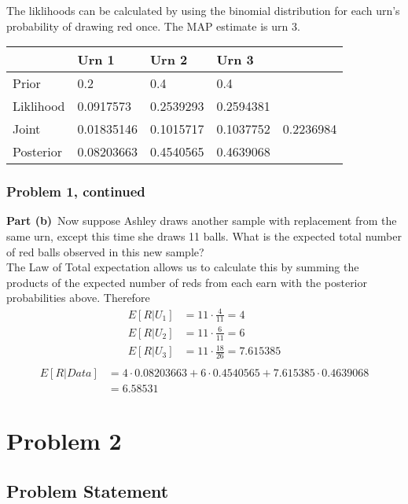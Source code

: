 \documentclass[12pt]{article}
\theoremstyle{definition}
\begin{document}
The liklihoods can be calculated by using the binomial distribution for each urn's probability of drawing red once. The MAP estimate is urn 3.\\

\begin{tabular}{lllll}
          & Urn 1      & Urn 2     & Urn 3     &           \\
\hline
Prior     & 0.2        & 0.4       & 0.4       &           \\
Liklihood & 0.0917573  & 0.2539293 & 0.2594381 &           \\
Joint     & 0.01835146 & 0.1015717 & 0.1037752 & 0.2236984 \\
Posterior & 0.08203663 & 0.4540565 & 0.4639068 &          \\
\hline
\end{tabular}


\newpage
\subsubsection*{Problem 1, continued}

\noindent
{\bf Part (b)}\ Now suppose Ashley draws another sample with replacement from the same urn, except this time she draws 11 balls. What is the expected total number of red balls observed in this new sample?\\

The Law of Total expectation allows us to calculate this by summing the products of the expected number of reds from each earn with the posterior probabilities above. Therefore
\begin{align*}
E[R|U_1] &= 11\cdot \frac{4}{11} = 4\\
E[R|U_2] &= 11\cdot \frac{6}{11} = 6\\
E[R|U_3] &= 11\cdot \frac{18}{26} = 7.615385\\
\end{align*}
\begin{align*}
E[R|Data] &= 4 \cdot 0.08203663 + 6 \cdot 0.4540565 + 7.615385 \cdot 0.4639068\\
&= 6.58531
\end{align*}

\newpage
\section*{Problem 2}

\subsection*{Problem Statement}
\end{document}
